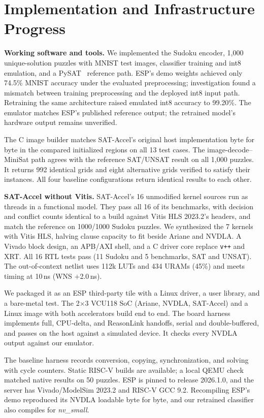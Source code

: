 \documentclass[conference,10pt,letterpaper]{IEEEtran}
\begin{document}
\section{Implementation and Infrastructure Progress}
\textbf{Working software and tools.} We implemented the Sudoku encoder, 1,000 unique-solution puzzles with MNIST test images, classifier training and int8 emulation, and a PySAT~\cite{pysat} reference path. ESP's demo weights achieved only 74.5\% MNIST accuracy under the evaluated preprocessing; investigation found a mismatch between training preprocessing and the deployed int8 input path. Retraining the same architecture raised emulated int8 accuracy to 99.20\%. The emulator matches ESP's published reference output; the retrained model's hardware output remains unverified.

The C image builder matches SAT-Accel's original host implementation byte for byte in the compared initialized regions on all 13 test cases. The image-decode--MiniSat path agrees with the reference SAT/UNSAT result on all 1,000 puzzles. It returns 992 identical grids and eight alternative grids verified to satisfy their instances. All four baseline configurations return identical results to each other.

\textbf{SAT-Accel without Vitis.} SAT-Accel's 16 unmodified kernel sources run as threads in a functional model. They pass all 16 of its benchmarks, with decision and conflict counts identical to a build against Vitis HLS 2023.2's headers, and match the reference on 1000/1000 Sudoku puzzles. We synthesized the 7 kernels with Vitis HLS, halving clause capacity to fit beside Ariane and NVDLA. A Vivado block design, an APB/AXI shell, and a C driver core replace \texttt{v++} and XRT. All 16 RTL tests pass (11 Sudoku and 5 benchmarks, SAT and UNSAT). The out-of-context netlist uses 112k LUTs and 434 URAMs (45\%) and meets timing at 10\,ns (WNS $+$2.0\,ns).

We packaged it as an ESP third-party tile with a Linux driver, a user library, and a bare-metal test. The 2$\times$3 VCU118 SoC (Ariane, NVDLA, SAT-Accel) and a Linux image with both accelerators build end to end. The board harness implements full, CPU-delta, and ReasonLink handoffs, serial and double-buffered, and passes on the host against a simulated device. It checks every NVDLA output against our emulator.

The baseline harness records conversion, copying, synchronization, and solving with cycle counters. Static RISC-V builds are available; a local QEMU check matched native results on 50 puzzles. ESP is pinned to release 2026.1.0, and the server has Vivado/ModelSim 2023.2 and RISC-V GCC 9.2. Recompiling ESP's demo reproduced its NVDLA loadable byte for byte, and our retrained classifier also compiles for \emph{nv\_small}.
\end{document}
